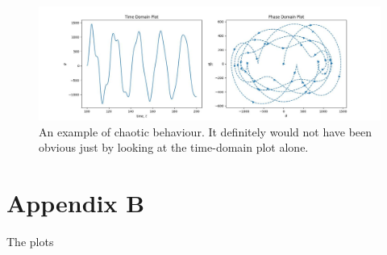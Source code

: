 \documentclass[10pt, twocolumn]{article}
\begin{document}
\begin{figure}
    \centering
    \includegraphics{Projects/ForcedSimplePendulum/Plots/demo_chaos.jpg}
    \caption{An example of chaotic behaviour. It definitely would not have been obvious just by looking at the time-domain plot alone.}
    \label{fig:enter-label}
\end{figure}

\section{Appendix B}
The plots
\end{document}
